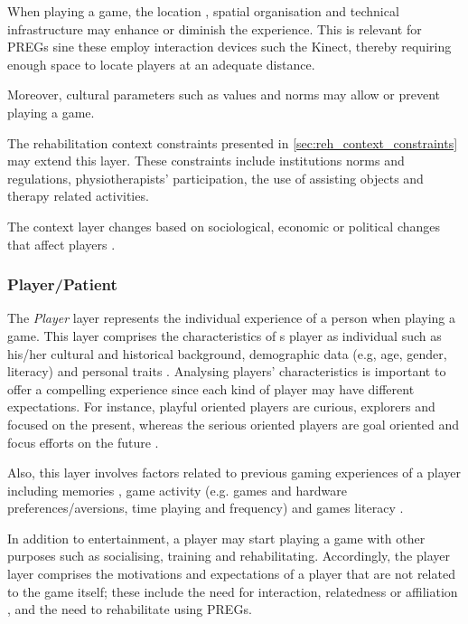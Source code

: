 When playing a game, the location \autocite{Engl2013,Elson2014}, spatial organisation \autocite{DeKort2007b} and technical infrastructure \autocite{Elson2014} may enhance or diminish the experience. This is relevant for \acp{PREG} sine these employ interaction devices such the Kinect, thereby requiring enough space to locate players at an adequate distance.

Moreover, cultural parameters such as values and norms \autocite{Elson2014,Mayra} may allow or prevent playing a game.

The rehabilitation context constraints presented in \autoref{sec:reh_context_constraints} may extend this layer. These constraints include institutions norms and regulations, physiotherapists' participation, the use of assisting objects and therapy related activities.

The context layer changes based on sociological, economic or political changes that affect players \autocite{Nackea2}.

\subsubsection*{Player/Patient}

The \textit{Player} layer represents the individual experience of a person when playing a game. This layer comprises the characteristics of s player as individual \autocite{Elson2014} such as his/her cultural \autocite{Elson2014} and historical \autocite{Mayra} background, demographic data (e.g, age, gender, literacy) \autocite{Elson2014,Fernandez2008,Ferrara} and personal traits \autocite{Elson2014}. Analysing players' characteristics is important to offer a compelling experience since each kind of player may have different expectations. For instance, playful oriented players are curious, explorers and focused on the present, whereas the serious oriented players are goal oriented and focus efforts on the future \autocite{Fernandez2008}.

Also, this layer involves factors related to previous gaming experiences of a player including memories \autocite{Elson2014}, game activity (e.g. games and hardware preferences/aversions, time playing and frequency) \autocite{Fernandez2008,Nackea2,Nacked,Mayra} and games literacy \autocite{Mayra}.

In addition to entertainment, a player may start playing a game with other purposes such as socialising, training and rehabilitating. Accordingly, the player layer comprises the motivations and expectations of a player that are not related to the game itself; these include the need for interaction, relatedness or affiliation \autocite{DeKort2007b,Mayra}, and the need to rehabilitate using \acp{PREG}.

